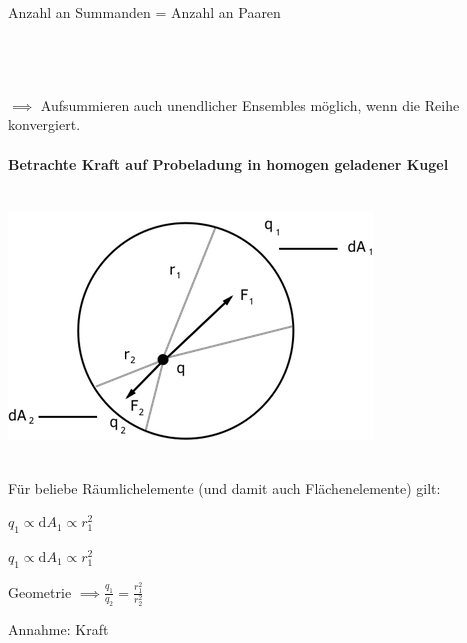 \documentclass[11pt]{article}
\begin{document}
\newline\\
\newline\\
\linebreak\\
\hfill\\
Anzahl an Summanden = Anzahl an Paaren
\newline\\


\newline\\
\linebreak\\
\hfill\\

$\implies$ Aufsummieren auch unendlicher Ensembles möglich, wenn die Reihe konvergiert. 

\paragraph{Betrachte Kraft auf Probeladung in homogen geladener Kugel}

\hfill\\

\includegraphics{skizzen/14/14_3B0}

\hfill\\

Für beliebe Räumlichelemente (und damit auch Flächenelemente) gilt:

$q_1 \propto \mathrm{d}A_1 \propto r_1^2$

$q_1 \propto \mathrm{d}A_1 \propto r_1^2$

Geometrie $\implies \frac{q_1}{q_2} = \frac{r_1^2}{r_2^2}$

Annahme: Kraft \propto {}
\end{document}
